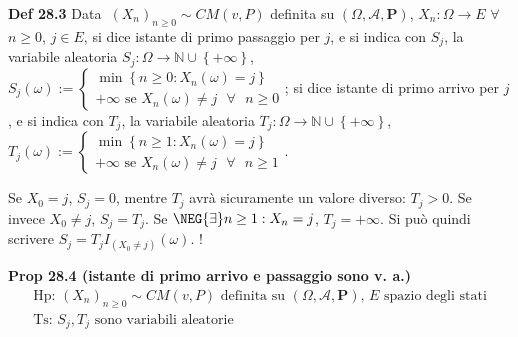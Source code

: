 \documentclass{article}
\begin{document}
\textbf{Def 28.3 }Data\textbf{\ }$\left( X_{n}\right) _{n\geq 0}\sim
CM\left( v,P\right) $ definita su $\left( \Omega ,\mathcal{A},\mathbf{P}%
\right) $, $X_{n}:\Omega \rightarrow E$ $\forall $ $n\geq 0$, $j\in E$, si
dice istante di primo passaggio per $j$, e si indica con $S_{j}$, la
variabile aleatoria $S_{j}:\Omega \rightarrow 
\mathbb{N}
\cup \left\{ +\infty \right\} $, $S_{j}\left( \omega \right) :=\left\{ 
\begin{array}{c}
\min \left\{ n\geq 0:X_{n}\left( \omega \right) =j\right\} \\ 
+\infty \text{ se }X_{n}\left( \omega \right) \neq j\text{ }\forall \text{ }%
n\geq 0%
\end{array}%
\right. $; si dice istante di primo arrivo per $j$, e si indica con $T_{j}$,
la variabile aleatoria $T_{j}:\Omega \rightarrow 
\mathbb{N}
\cup \left\{ +\infty \right\} $, $T_{j}\left( \omega \right) :=\left\{ 
\begin{array}{c}
\min \left\{ n\geq 1:X_{n}\left( \omega \right) =j\right\} \\ 
+\infty \text{ se }X_{n}\left( \omega \right) \neq j\text{ }\forall \text{ }%
n\geq 1%
\end{array}%
\right. $.

Se $X_{0}=j$, $S_{j}=0$, mentre $T_{j}$ avr\`{a} sicuramente un valore
diverso: $T_{j}>0$. Se invece $X_{0}\neq j$, $S_{j}=T_{j}$. Se $\NEG%
{\exists}n\geq 1:X_{n}=j$, $T_{j}=+\infty $. Si pu\`{o} quindi scrivere $%
S_{j}=T_{j}I_{\left( X_{0}\neq j\right) }\left( \omega \right) $. !

\textbf{Prop 28.4 (istante di primo arrivo e passaggio sono v. a.)}%
\begin{gather*}
\text{Hp}\text{: }\left( X_{n}\right) _{n\geq 0}\sim CM\left( v,P\right) 
\text{ definita su }\left( \Omega ,\mathcal{A},\mathbf{P}\right) \text{, }E%
\text{ spazio degli stati} \\
\text{Ts}\text{: }S_{j},T_{j}\text{ sono variabili aleatorie}
\end{gather*}
\end{document}

